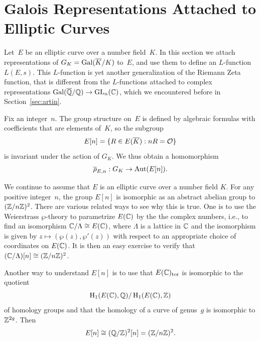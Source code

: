 \section{Galois Representations Attached to Elliptic Curves}
Let~$E$ be an elliptic curve over a number field~$K$.
In this section we attach representations of
$G_K = \operatorname{Gal}(\overline{K}/K)$ to~$E$, and use them to define an $L$-function
$L(E,s)$.   This $L$-function is yet another generalization of the
Riemann Zeta function, that is different from the $L$-functions
attached to complex representations $\operatorname{Gal}(\overline{\mathbb{Q}}/\mathbb{Q})\to \operatorname{GL}_n(\mathbb{C})$,
which we encountered before in Section~\ref{sec:artin}.

Fix an integer~$n$.  The group structure on~$E$ is defined by
algebraic formulas with coefficients that are elements of~$K$, so the subgroup
$$
 E[n] = \{R \in E(\overline{K}) : nR = \mathcal{O}\}
$$
is invariant under the action of $G_K$.  We thus obtain a homomorphism
$$
  \overline{\rho}_{E,n} : G_K \to \operatorname{Aut}(E[n]).
$$


We continue to assume that $E$ is an elliptic curve over a number field $K$.
For any positive integer~$n$, the group $E[n]$ is isomorphic as an
abstract abelian group to $(\mathbb{Z}/n\mathbb{Z})^2$.  There are various
related ways to see why this is true. One is to use the Weierstrass
$\wp$-theory to parametrize $E(\mathbb{C})$ by the the complex numbers, i.e.,
to find an isomorphism $\mathbb{C}/\Lambda \cong E(\mathbb{C})$, where $\Lambda$ is a
lattice in $\mathbb{C}$ and the isomorphism is given by $z\mapsto
(\wp(z),\wp'(z))$ with respect to an appropriate choice of coordinates
on $E(\mathbb{C})$.  It is then an easy exercise to verify that
$(\mathbb{C}/\Lambda)[n]\cong (\mathbb{Z}/n\mathbb{Z})^2$.

Another way to understand $E[n]$ is to use that $E(\mathbb{C})_{\operatorname{tor}}$ is isomorphic
to the quotient
$$\operatorname{H}_1(E(\mathbb{C}),\mathbb{Q})/\operatorname{H}_1(E(\mathbb{C}),\mathbb{Z})$$
of homology groups and that the homology of a curve
of genus~$g$ is isomorphic to $\mathbb{Z}^{2g}$.  Then
$$
 E[n]\cong (\mathbb{Q}/\mathbb{Z})^2[n] = (\mathbb{Z}/n\mathbb{Z})^2.
$$


